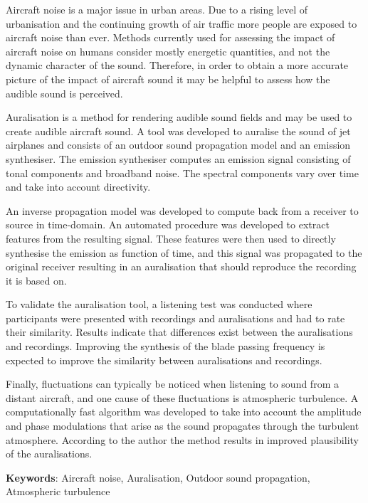 Aircraft noise is a major issue in urban areas. Due to a rising level of
urbanisation and the continuing growth of air traffic more people are exposed to
aircraft noise than ever. Methods currently used for assessing the
impact of aircraft noise on humans consider mostly energetic quantities, and not the
dynamic character of the sound. Therefore, in order to obtain a more accurate
picture of the impact of aircraft sound it may be helpful to assess how the audible
sound is perceived.

Auralisation is a method for rendering audible sound fields and may be used to
create audible aircraft sound. A tool was developed to auralise the sound of jet
airplanes and consists of an outdoor sound propagation model and an emission synthesiser.
The emission synthesiser computes an emission signal consisting of tonal
components and broadband noise. The spectral components vary over time and take
into account directivity.

An inverse propagation model was developed to compute back from a receiver to
source in time-domain. An automated procedure was developed to extract features
from the resulting signal. These features were then used to directly synthesise
the emission as function of time, and this signal was propagated to the original
receiver resulting in an auralisation that should reproduce the recording
it is based on.

To validate the auralisation tool, a listening test was conducted where participants
were presented with recordings and auralisations and had to rate their similarity.
Results indicate that differences exist between the auralisations and recordings.
Improving the synthesis of the blade passing frequency is expected to improve the similarity
between auralisations and recordings.

Finally, fluctuations can typically be noticed when listening to sound from a
distant aircraft, and one cause of these fluctuations is atmospheric turbulence.
A computationally fast algorithm was developed to take into account the
amplitude and phase modulations that arise as the sound propagates through the
turbulent atmosphere. According to the author the method results in improved
plausibility of the auralisations.



\vspace{0.1cm}

\textbf{Keywords}: Aircraft noise, Auralisation, Outdoor sound propagation, Atmospheric turbulence
